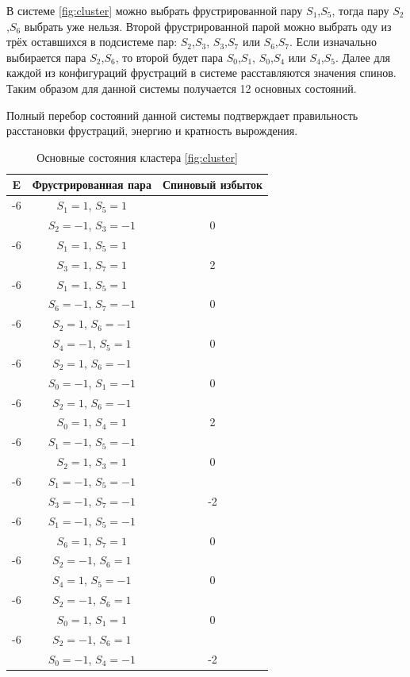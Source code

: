\documentclass[utf8, babel, sor, jor, amsmath, amssymb, reprint]{elsarticle} %
\begin{document}
В системе \eqref{fig:cluster}  можно выбрать фрустрированной пару $S_1$,$S_5$, тогда пару  $S_2$,$S_6$ выбрать уже нельзя. Второй фрустрированной парой можно выбрать оду из трёх оставшихся в подсистеме пар: $S_2$,$S_3$, $S_3$,$S_7$ или $S_6$,$S_7$. Если изначально выбирается пара $S_2$,$S_6$, то второй будет пара $S_0$,$S_1$, $S_0$,$S_4$ или $S_4$,$S_5$. Далее для каждой из конфигураций фрустраций в системе расставляются значения спинов. Таким образом для данной системы получается 12 основных состояний. 

Полный перебор состояний данной системы подтверждает правильность расстановки фрустраций, энергию и кратность вырождения.

\begin{table}[h]
	\centering
	\begin{tabular}{|c|c|c|}
		\hline
		E   &   Фрустрированная пара & Спиновый избыток\\
		\hline
		-6   &  $S_1=1$, $S_5=1$ & \\
		      &    $S_2=-1$, $S_3=-1$ &0 \\
		 \hline
		 -6   &  $S_1=1$, $S_5=1$ &\\
		      &    $S_3=1$, $S_7=1$ & 2\\
		 \hline
		 -6   &  $S_1=1$, $S_5=1$ & \\
		      &    $S_6=-1$, $S_7=-1$ & 0\\
		 \hline
		-6   &  $S_2=1$, $S_6=-1$ & \\
				&    $S_4=-1$, $S_5=1$ & 0\\
		 \hline
		-6   &  $S_2=1$, $S_6=-1$ &\\
				&    $S_0=-1$, $S_1=-1$ & 0\\
		 \hline
		-6   &  $S_2=1$, $S_6=-1$ &\\
				&    $S_0=1$, $S_4=1$ & 2\\
		\hline
		-6   &  $S_1=-1$, $S_5=-1$ &\\
			&    $S_2=1$, $S_3=1$ & 0\\
		\hline
		-6   &  $S_1=-1$, $S_5=-1$ &\\
			&    $S_3=-1$, $S_7=-1$ & -2\\
		\hline
		-6   &  $S_1=-1$, $S_5=-1$ &\\
			&    $S_6=1$, $S_7=1$ & 0\\
		\hline
		-6   &  $S_2=-1$, $S_6=1$ &\\
			&    $S_4=1$, $S_5=-1$ & 0\\
		\hline
		-6   &  $S_2=-1$, $S_6=1$ &\\
			&    $S_0=1$, $S_1=1$ & 0\\
		\hline
		-6   &  $S_2=-1$, $S_6=1$ &\\
			&    $S_0=-1$, $S_4=-1$ & -2\\
		\hline
	\end{tabular}
	\caption{Основные состояния кластера \eqref{fig:cluster}}
	\label{tab:gs_cl}
\end{table}
\end{document}
